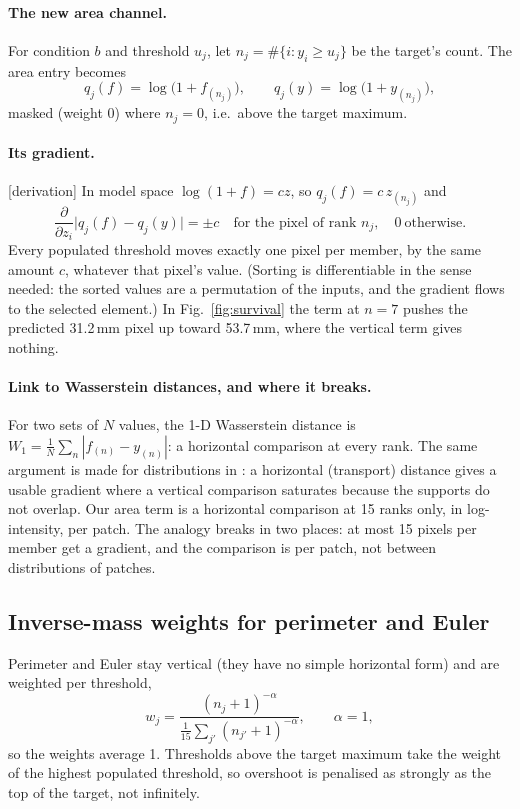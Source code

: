 \documentclass[11pt,a4paper]{article}
\newcommand{\status}[1]{\textsf{\small[#1]}}
\begin{document}
\paragraph{The new area channel.} For condition $b$ and threshold $u_j$, let $n_j = \#\{i : y_i\ge u_j\}$ be the target's
count. The area entry becomes
\begin{equation}
  q_j(f) = \log\big(1 + f_{(n_j)}\big),\qquad q_j(y) = \log\big(1 + y_{(n_j)}\big),
\end{equation}
masked (weight 0) where $n_j = 0$, i.e.\ above the target maximum.

\paragraph{Its gradient.} \status{derivation} In model space $\log(1+f) = cz$, so $q_j(f) = c\,z_{(n_j)}$ and
\begin{equation}
  \frac{\partial}{\partial z_i}\big|q_j(f) - q_j(y)\big| = \pm c\quad\text{for the pixel of rank } n_j,\quad 0\ \text{otherwise.}
\end{equation}
Every populated threshold moves exactly one pixel per member, by the same amount $c$, whatever that pixel's value.
(Sorting is differentiable in the sense needed: the sorted values are a permutation of the inputs, and the gradient
flows to the selected element.) In Fig.~\ref{fig:survival} the term at $n = 7$ pushes the predicted 31.2\,mm pixel up
toward 53.7\,mm, where the vertical term gives nothing.

\paragraph{Link to Wasserstein distances, and where it breaks.} For two sets of $N$ values, the 1-D Wasserstein distance
is $W_1 = \frac1N\sum_n |f_{(n)} - y_{(n)}|$: a horizontal comparison at every rank. The same argument is made for
distributions in \citep{arjovsky2017wgan}: a horizontal (transport) distance gives a usable gradient where a vertical
comparison saturates because the supports do not overlap. Our area term is a horizontal comparison at 15 ranks only,
in log-intensity, per patch. The analogy breaks in two places: at most 15 pixels per member get a gradient, and the
comparison is per patch, not between distributions of patches.

\subsection{Inverse-mass weights for perimeter and Euler}
Perimeter and Euler stay vertical (they have no simple horizontal form) and are weighted per threshold,
\begin{equation}
  w_j = \frac{(n_j+1)^{-\alpha}}{\frac1{15}\sum_{j'}(n_{j'}+1)^{-\alpha}},\qquad \alpha = 1,
\end{equation}
so the weights average 1. Thresholds above the target maximum take the weight of the highest populated threshold, so
overshoot is penalised as strongly as the top of the target, not infinitely.
\end{document}
